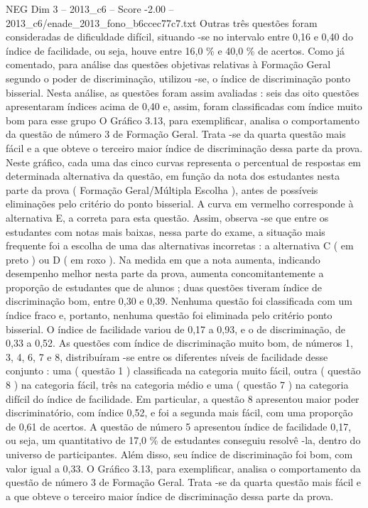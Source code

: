 \begin{textsample}{NEG Dim 3 – 2013\_c6 – Score -2.00 – 2013\_c6/enade\_2013\_fono\_b6ccec77c7.txt}
Outras três questões foram consideradas de dificuldade difícil, situando -se no intervalo entre 0,16 e 0,40 do índice de facilidade, ou seja, houve entre 16,0 \% e 40,0 \% de acertos.
Como já comentado, para análise das questões objetivas relativas à Formação Geral segundo o poder de discriminação, utilizou -se, o índice de discriminação ponto bisserial.
Nesta análise, as questões foram assim avaliadas : seis das oito questões apresentaram índices acima de 0,40 e, assim, foram classificadas com índice muito bom para esse grupo O Gráfico 3.13, para exemplificar, analisa o comportamento da questão de número 3 de Formação Geral.
Trata -se da quarta questão mais fácil e a que obteve o terceiro maior índice de discriminação dessa parte da prova.
Neste gráfico, cada uma das cinco curvas representa o percentual de respostas em determinada alternativa da questão, em função da nota dos estudantes nesta parte da prova ( Formação Geral/Múltipla Escolha ), antes de possíveis eliminações pelo critério do ponto bisserial.
A curva em vermelho corresponde à alternativa E, a correta para esta questão.
Assim, observa -se que entre os estudantes com notas mais baixas, nessa parte do exame, a situação mais frequente foi a escolha de uma das alternativas incorretas : a alternativa C ( em preto ) ou D ( em roxo ).
Na medida em que a nota aumenta, indicando desempenho melhor nesta parte da prova, aumenta concomitantemente a proporção de estudantes que de alunos ; duas questões tiveram índice de discriminação bom, entre 0,30 e 0,39.
Nenhuma questão foi classificada com um índice fraco e, portanto, nenhuma questão foi eliminada pelo critério ponto bisserial.
O índice de facilidade variou de 0,17 a 0,93, e o de discriminação, de 0,33 a 0,52.
As questões com índice de discriminação muito bom, de números 1, 3, 4, 6, 7 e 8, distribuíram -se entre os diferentes níveis de facilidade desse conjunto : uma ( questão 1 ) classificada na categoria muito fácil, outra ( questão 8 ) na categoria fácil, três na categoria médio e uma ( questão 7 ) na categoria difícil do índice de facilidade.
Em particular, a questão 8 apresentou maior poder discriminatório, com índice 0,52, e foi a segunda mais fácil, com uma proporção de 0,61 de acertos.
A questão de número 5 apresentou índice de facilidade 0,17, ou seja, um quantitativo de 17,0 \% de estudantes conseguiu resolvê -la, dentro do universo de participantes.
Além disso, seu índice de discriminação foi bom, com valor igual a 0,33.
O Gráfico 3.13, para exemplificar, analisa o comportamento da questão de número 3 de Formação Geral.
Trata -se da quarta questão mais fácil e a que obteve o terceiro maior índice de discriminação dessa parte da prova.

\end{textsample}

